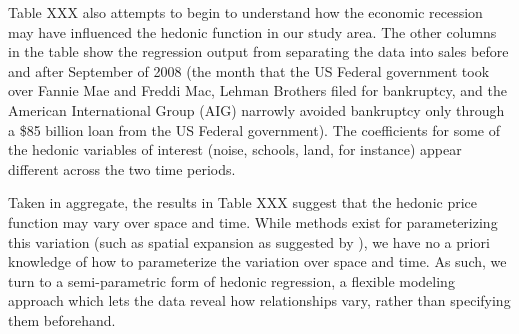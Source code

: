 \documentclass{article}\usepackage{graphicx, color}
\begin{document}
Table XXX also attempts to begin to understand how the economic recession may have influenced the hedonic function in our study area. The other columns in the table show the regression output from separating the data into sales before and after September of 2008 (the month that the US Federal government took over Fannie Mae and Freddi Mac, Lehman Brothers filed for bankruptcy, and the American International Group (AIG) narrowly avoided bankruptcy only through a \$85 billion loan from the US Federal government). The coefficients for some of the hedonic variables of interest (noise, schools, land, for instance) appear different across the two time periods.

Taken in aggregate, the results in Table XXX suggest that the hedonic price function may vary over space and time. While methods exist for parameterizing this variation (such as spatial expansion as suggested by \citet{Casetti1974}), we have no a priori knowledge of how to parameterize the variation over space and time. As such, we turn to a semi-parametric form of hedonic regression, a flexible modeling approach which lets the data reveal how relationships vary, rather than specifying them beforehand.
\end{document}
